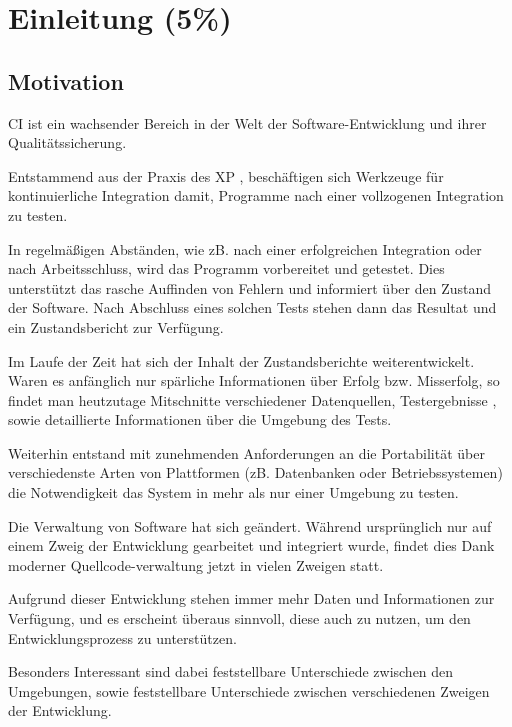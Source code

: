 \chapter{Einleitung (5\%) }
\label{chap:intro}
\section{Motivation}

\ac{CI} ist ein wachsender Bereich
in der Welt der Software-Entwicklung und ihrer Qualitätssicherung.

Entstammend aus der Praxis des \ac{XP}
\cite{xp:explained, folwer:xp},
beschäftigen sich Werkzeuge für kontinuierliche Integration damit,
Programme nach einer vollzogenen Integration zu testen.

In regelmäßigen Abständen, wie zB. nach einer erfolgreichen Integration oder nach Arbeitsschluss,
wird das Programm vorbereitet und getestet.
Dies unterstützt das rasche Auffinden von Fehlern
und informiert über den Zustand der Software.
Nach Abschluss eines solchen Tests stehen dann das Resultat
und ein Zustandsbericht zur Verfügung.

Im Laufe der Zeit hat sich der Inhalt der Zustandsberichte weiterentwickelt.
Waren es anfänglich nur spärliche Informationen über Erfolg bzw. Misserfolg,
so findet man heutzutage Mitschnitte verschiedener Datenquellen, Testergebnisse
\cite{jenkins:junitxml}, sowie detaillierte Informationen über die Umgebung des Tests.

Weiterhin entstand mit zunehmenden Anforderungen an die Portabilität über
verschiedenste Arten von Plattformen (zB. Datenbanken oder Betriebssystemen)
die Notwendigkeit das System in mehr als nur einer Umgebung zu testen.

Die Verwaltung von Software hat sich geändert.
Während ursprünglich nur auf einem Zweig der Entwicklung gearbeitet und integriert wurde,
findet dies Dank moderner Quellcode-verwaltung jetzt in vielen Zweigen statt.
\cite{dvcs:vorteile, dvcs:entwicklungsmodelle}

Aufgrund dieser Entwicklung stehen immer mehr Daten und Informationen zur Verfügung,
und es erscheint überaus sinnvoll, diese auch zu nutzen, um den Entwicklungsprozess zu unterstützen.

Besonders Interessant sind dabei feststellbare Unterschiede zwischen den Umgebungen,
sowie feststellbare Unterschiede zwischen verschiedenen Zweigen der Entwicklung.




